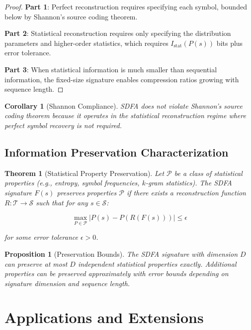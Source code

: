\documentclass[11pt]{article}
\newtheorem{theorem}{Theorem}
\newtheorem{proposition}{Proposition}
\newtheorem{corollary}{Corollary}
\newcommand{\sdfa}{\textsc{SDFA}}
\newcommand{\seqspace}{\mathcal{S}}
\newcommand{\sigspace}{\mathcal{T}}
\newcommand{\prob}[1]{P(#1)}
\begin{document}
\begin{proof}
\textbf{Part 1}: Perfect reconstruction requires specifying each symbol, bounded below by Shannon's source coding theorem.

\textbf{Part 2}: Statistical reconstruction requires only specifying the distribution parameters and higher-order statistics, which requires $I_{\text{stat}}(\prob{s})$ bits plus error tolerance.

\textbf{Part 3}: When statistical information is much smaller than sequential information, the fixed-size signature enables compression ratios growing with sequence length.
\end{proof}

\begin{corollary}[Shannon Compliance]
\sdfa{} does not violate Shannon's source coding theorem because it operates in the statistical reconstruction regime where perfect symbol recovery is not required.
\end{corollary}

\subsection{Information Preservation Characterization}

\begin{theorem}[Statistical Property Preservation]
Let $\mathcal{P}$ be a class of statistical properties (e.g., entropy, symbol frequencies, $k$-gram statistics). The \sdfa{} signature $F(s)$ preserves properties $\mathcal{P}$ if there exists a reconstruction function $R: \sigspace \to \seqspace$ such that for any $s \in \seqspace$:

\[\max_{P \in \mathcal{P}} |P(s) - P(R(F(s)))| \leq \epsilon\]

for some error tolerance $\epsilon > 0$.
\end{theorem}

\begin{proposition}[Preservation Bounds]
The \sdfa{} signature with dimension $D$ can preserve at most $D$ independent statistical properties exactly. Additional properties can be preserved approximately with error bounds depending on signature dimension and sequence length.
\end{proposition}

\section{Applications and Extensions}
\end{document}
